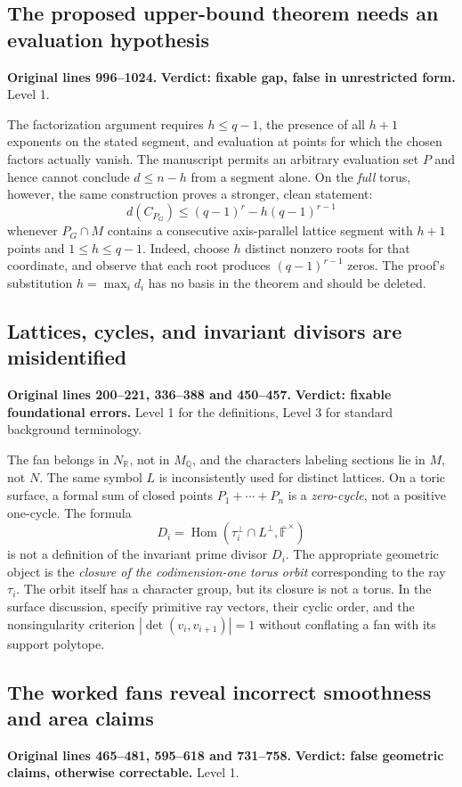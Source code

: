 \documentclass[12pt,letterpaper]{article}
\newcommand{\F}{\mathbb F}
\newcommand{\err}[1]{\textbf{#1}}
\newcommand{\level}[1]{\textsf{Level #1}}
\begin{document}
\subsection{The proposed upper-bound theorem needs an evaluation hypothesis}\label{sec:upper}
\textbf{Original lines 996--1024.}\quad
\err{Verdict: fixable gap, false in unrestricted form.} \level{1}.

The factorization argument requires $h\le q-1$, the presence of all $h+1$ exponents on the stated segment, and evaluation at points for which the chosen factors actually vanish.  The manuscript permits an arbitrary evaluation set $P$ and hence cannot conclude $d\le n-h$ from a segment alone.  On the \emph{full} torus, however, the same construction proves a stronger, clean statement:
\[
\boxed{d(C_{P_G})\le(q-1)^r-h(q-1)^{r-1}}
\]
whenever $P_G\cap M$ contains a consecutive axis-parallel lattice segment with $h+1$ points and $1\le h\le q-1$.  Indeed, choose $h$ distinct nonzero roots for that coordinate, and observe that each root produces $(q-1)^{r-1}$ zeros.  The proof's substitution $h=\max_i d_i$ has no basis in the theorem and should be deleted.

\subsection{Lattices, cycles, and invariant divisors are misidentified}\label{sec:geometry}
\textbf{Original lines 200--221, 336--388 and 450--457.}\quad
\err{Verdict: fixable foundational errors.} \level{1} for the definitions, \level{3} for standard background terminology.

The fan belongs in $N_{\mathbb R}$, not in $M_{\mathbb Q}$, and the characters labeling sections lie in $M$, not $N$.  The same symbol $L$ is inconsistently used for distinct lattices.  On a toric surface, a formal sum of closed points $P_1+\cdots+P_n$ is a \emph{zero-cycle}, not a positive one-cycle.  The formula
\[
D_i=\operatorname{Hom}(\tau_i^\perp\cap L^\perp,\overline{\F}^{\times})
\]
is not a definition of the invariant prime divisor $D_i$.  The appropriate geometric object is the \emph{closure of the codimension-one torus orbit} corresponding to the ray $\tau_i$.  The orbit itself has a character group, but its closure is not a torus.  In the surface discussion, specify primitive ray vectors, their cyclic order, and the nonsingularity criterion $|\det(v_i,v_{i+1})|=1$ without conflating a fan with its support polytope.

\subsection{The worked fans reveal incorrect smoothness and area claims}\label{sec:fans}
\textbf{Original lines 465--481, 595--618 and 731--758.}\quad
\err{Verdict: false geometric claims, otherwise correctable.} \level{1}.
\end{document}
